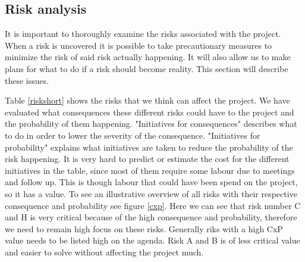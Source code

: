 \subsection{Risk analysis}
\label{risk}
It is important to thoroughly examine the risks associated with the project. When a risk is uncovered it is possible to take precautionary measures to minimize the risk of said risk actually happening. It will also allow us to make plans for what to do if a risk should become reality. This section will describe these issues.

Table \ref{riskshort} shows the risks that we think can affect the project. 
We have evaluated what consequences these different risks could have to the project and the probability of them happening.
"Initiatives for consequences" describes what to do in order to lower the severity of the consequence.
"Initiatives for probability" explains what initiatives are taken to reduce the probability of the risk happening.
It is very hard to predict or estimate the cost for the different initiatives in the table, since most of them require some labour due to meetings and follow up. 
This is though labour that could have been spend on the project, so it has a value. 
To see an illustrative overview of all risks with their respective consequence and probability see figure \ref{cxp}.
Here we can see that risk number C and H is very critical because of the high consequence and probability, therefore we need to remain high focus on these risks. Generally riks with a high CxP value needs to be listed high on the agenda. 
Risk A and B is of less critical value and easier to solve without affecting the project much.


